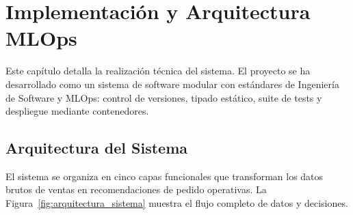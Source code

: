 \chapter{Implementación y Arquitectura MLOps}
\label{chap:implementacion}

Este capítulo detalla la realización técnica del sistema. El proyecto se ha desarrollado como un sistema de software modular con estándares de Ingeniería de Software y MLOps: control de versiones, tipado estático, suite de tests y despliegue mediante contenedores.

\section{Arquitectura del Sistema}

El sistema se organiza en cinco capas funcionales que transforman los datos brutos de ventas en recomendaciones de pedido operativas. La Figura~\ref{fig:arquitectura_sistema} muestra el flujo completo de datos y decisiones.

